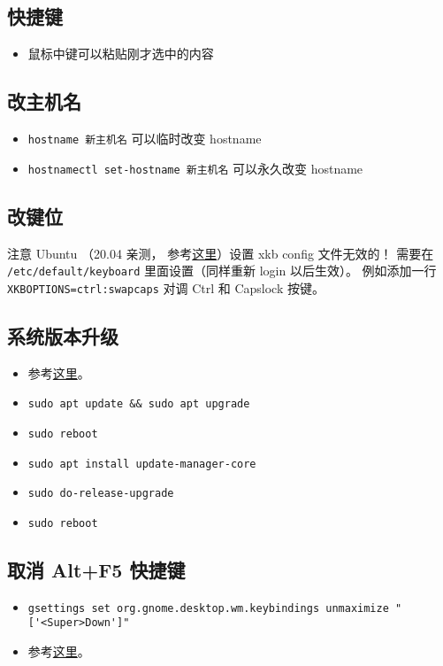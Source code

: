 
\subsection{快捷键}
\begin{itemize}
\item 鼠标中键可以粘贴刚才选中的内容
\end{itemize}


\subsection{改主机名}
\begin{itemize}
\item \verb|hostname 新主机名| 可以临时改变 hostname
\item \verb|hostnamectl set-hostname 新主机名| 可以永久改变 hostname
\end{itemize}


\subsection{改键位}\label{Ubuntu_sub1}
注意 Ubuntu （20.04 亲测， 参考\href{https://manpages.ubuntu.com/manpages/focal/en/man5/keyboard.5.html}{这里}）设置 xkb config 文件无效的！ 需要在 \verb|/etc/default/keyboard| 里面设置（同样重新 login 以后生效）。 例如添加一行 \verb|XKBOPTIONS=ctrl:swapcaps| 对调 Ctrl 和 Capslock 按键。

\subsection{系统版本升级}
\begin{itemize}
\item 参考\href{https://www.cyberciti.biz/faq/upgrade-ubuntu-18-04-to-20-04-lts-using-command-line/#Make_a_backup}{这里}。
\item \verb|sudo apt update && sudo apt upgrade|
\item \verb|sudo reboot|
\item \verb|sudo apt install update-manager-core|
\item \verb|sudo do-release-upgrade|
\item \verb|sudo reboot|
\end{itemize}

\subsection{取消 Alt+F5 快捷键}
\begin{itemize}
\item \verb|gsettings set org.gnome.desktop.wm.keybindings unmaximize "['<Super>Down']"|
\item 参考\href{https://askubuntu.com/questions/1322105/cant-find-alt-f5-in-settings-keyboard-shortcuts}{这里}。
\end{itemize}

